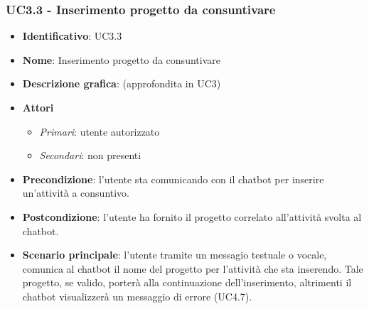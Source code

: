 \subsubsection{UC3.3 - Inserimento progetto da consuntivare}
\begin{itemize}
    \item \textbf{Identificativo}: UC3.3 
    \item \textbf{Nome}: Inserimento progetto da consuntivare  
    \item \textbf{Descrizione grafica}: (approfondita in UC3)
    \item \textbf{Attori}
        \begin{itemize} 
            \item \textit{Primari}: utente autorizzato
            \item \textit{Secondari}: non presenti
        \end{itemize}
    \item \textbf{Precondizione}: l'utente sta comunicando con il chatbot per inserire un'attività a consuntivo. 
    \item \textbf{Postcondizione}: l'utente ha fornito il progetto correlato all'attività svolta al chatbot. 
    \item \textbf{Scenario principale}: l'utente tramite un messagio testuale o vocale, comunica al chatbot il nome del progetto per l'attività che sta inserendo. Tale progetto, se valido, porterà alla continuazione dell'inserimento, altrimenti il chatbot visualizzerà un messaggio di errore (UC4.7). 
\end{itemize}

